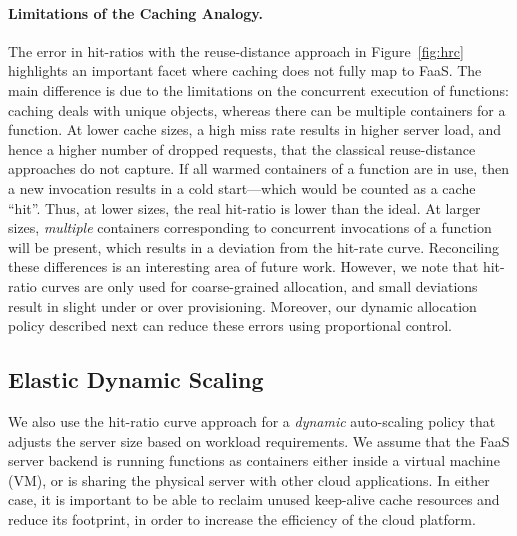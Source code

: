 \paragraph{Limitations of the Caching Analogy.}
The error in hit-ratios with the reuse-distance approach in Figure~\ref{fig:hrc} highlights an important facet where caching does not fully map to FaaS.
The main difference is due to the limitations on the concurrent execution of functions: 
caching deals with unique objects, whereas there can be  multiple containers for a function. 
%
At lower cache sizes, a high miss rate results in higher server load, and hence a higher number of dropped requests, that the classical reuse-distance approaches do not capture.
If all warmed containers of a function are in use, then a new invocation results in a cold start---which would be counted as a cache ``hit''.
Thus, at lower sizes, the real hit-ratio is lower than the ideal. 
At larger sizes, \emph{multiple} containers corresponding to concurrent invocations of a function will be present, which results in a deviation from the hit-rate curve. 
Reconciling these differences is an interesting area of future work. %
However, we note that hit-ratio curves are only used for coarse-grained allocation, and small deviations result in slight under or over provisioning. 
Moreover, our dynamic allocation policy described next can reduce these errors using proportional control. 



\subsection{Elastic Dynamic Scaling}
\label{subsec:dynamic}

We also use the hit-ratio curve approach for a \emph{dynamic} auto-scaling policy that adjusts the server size based on workload requirements. 
%
We assume that the FaaS server backend is running functions as containers either inside a virtual machine (VM), or is sharing the physical server with other cloud applications. 
In either case, it is important to be able to reclaim unused keep-alive cache resources and reduce its footprint, in order to increase the efficiency of the cloud platform. 

